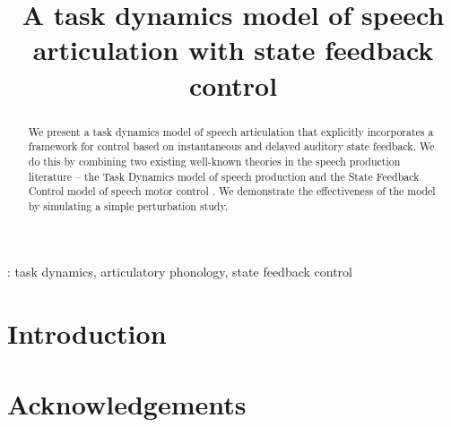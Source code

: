 \documentclass[a4paper]{article}
\title{A task dynamics model of speech articulation with state feedback control}
\begin{document}
  \maketitle
  \begin{abstract}

  We present a task dynamics model of speech articulation that explicitly incorporates a framework for control based on instantaneous and delayed auditory state feedback. We do this by combining two existing well-known theories in the speech production literature -- the Task Dynamics model of speech production \cite{SALTZMAN89} and the State Feedback Control model of speech motor control \cite{HOUDE12}. We demonstrate the effectiveness of the model by simulating a simple perturbation study. 
  \let\thefootnote\relax{} 
  \end{abstract}
  : task dynamics, articulatory phonology, state feedback control


  \section{Introduction}


  \section{Acknowledgements}
  


  \newpage
  \eightpt
  
  
\end{document}
